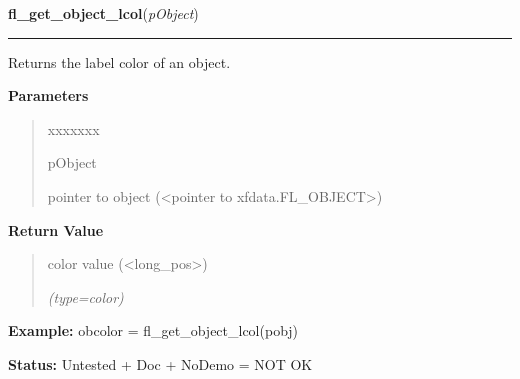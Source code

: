 \hspace{.8\funcindent}\begin{boxedminipage}{\funcwidth}

    \raggedright \textbf{fl\_get\_object\_lcol}(\textit{pObject})

    \vspace{-1.5ex}

    \rule{\textwidth}{0.5\fboxrule}
\setlength{\parskip}{2ex}
    Returns the label color of an object.

\setlength{\parskip}{1ex}
      \textbf{Parameters}
      \vspace{-1ex}

      \begin{quote}
        \begin{Ventry}{xxxxxxx}

          \item[pObject]

          pointer to object ({\textless}pointer to 
          xfdata.FL\_OBJECT{\textgreater})

        \end{Ventry}

      \end{quote}

      \textbf{Return Value}
    \vspace{-1ex}

      \begin{quote}
      color value ({\textless}long\_pos{\textgreater})

      {\it (type=color)}

      \end{quote}

\textbf{Example:} obcolor = fl\_get\_object\_lcol(pobj)



\textbf{Status:} Untested + Doc + NoDemo = NOT OK



    \end{boxedminipage}

    \label{xformslib:library:fl_set_object_return}

    \vspace{0.5ex}

